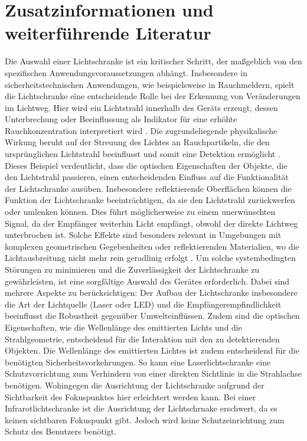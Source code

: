 %
\section{Zusatzinformationen und weiterführende Literatur }

Die Auswahl einer Lichtschranke ist ein kritischer Schritt, der maßgeblich von den spezifischen Anwendungsvoraussetzungen abhängt. Insbesondere in sicherheitstechnischen Anwendungen, wie beispielsweise in Rauchmeldern, spielt die Lichtschranke eine entscheidende Rolle bei der Erkennung von Veränderungen im Lichtweg. Hier wird ein Lichtstrahl innerhalb des Geräts erzeugt, dessen Unterbrechung oder Beeinflussung als Indikator für eine erhöhte Rauchkonzentration interpretiert wird \cite{Hesse:2009}. Die zugrundeliegende physikalische Wirkung beruht auf der Streuung des Lichtes an Rauchpartikeln, die den ursprünglichen Lichtstrahl beeinflusst und somit eine Detektion ermöglicht \cite{Hesse:2009}. Dieses Beispiel verdeutlicht, dass die optischen Eigenschaften der Objekte, die den Lichtstrahl passieren, einen entscheidenden Einfluss auf die Funktionalität der Lichtschranke ausüben.
Insbesondere reflektierende Oberflächen können die Funktion der Lichtschranke beeinträchtigen, da sie den Lichtstrahl zurückwerfen oder umlenken können. Dies führt möglicherweise zu einem unerwünschten Signal, da der Empfänger weiterhin Licht empfängt, obwohl der direkte Lichtweg unterbrochen ist. Solche Effekte sind besonders relevant in Umgebungen mit komplexen geometrischen Gegebenheiten oder reflektierenden Materialien, wo die Lichtausbreitung nicht mehr rein geradlinig erfolgt .
Um solche systembedingten Störungen zu minimieren und die Zuverlässigkeit der Lichtschranke zu gewährleisten, ist eine sorgfältige Auswahl des Gerätes erforderlich. Dabei sind mehrere Aspekte zu berücksichtigen: Der Aufbau der Lichtschranke insbesondere die Art der Lichtquelle (Laser oder LED) und die Empfängerempfindlichkeit beeinflusst die Robustheit gegenüber Umwelteinflüssen. Zudem sind die optischen Eigenschaften, wie die Wellenlänge des emittierten Lichts und die Strahlgeometrie, entscheidend für die Interaktion mit den zu detektierenden Objekten. Die Wellenlänge des emittierten Lichtes ist zudem entscheidend für die benötigten Sicherheitsvorkehrungen. So kann eine Laserlichtschranke eine Schutzvorrichtung zum Verhindern von einer direkten Sichtlinie in die Strahlachse benötigen. Wohingegen die Ausrichtung der Lichtschranke aufgrund der Sichtbarkeit des Fokuspunktes hier erleichtert werden kann. Bei einer Infrarotlichtschranke ist die Ausrichtung der Lichtschrnake erschwert, da es keinen sichtbaren Fokuspunkt gibt. Jedoch wird keine Schutzeinrichtung zum Schutz des Benutzers benötigt. 
